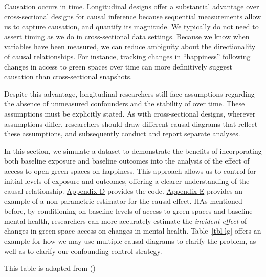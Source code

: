 \documentclass[
  singlecolumn]{article}
\begin{document}
Causation occurs in time. Longitudinal designs offer a substantial
advantage over cross-sectional designs for causal inference because
sequential measurements allow us to capture causation, and quantify its
magnitude. We typically do not need to assert timing as we do in
cross-sectional data settings. Because we know when variables have been
measured, we can reduce ambiguity about the directionality of causal
relationships. For instance, tracking changes in ``happiness'' following
changes in access to green spaces over time can more definitively
suggest causation than cross-sectional snapshots.

Despite this advantage, longitudinal researchers still face assumptions
regarding the absence of unmeasured confounders and the stability of
over time. These assumptions must be explicitly stated. As with
cross-sectional designs, wherever assumptions differ, researchers should
draw different causal diagrams that reflect these assumptions, and
subsequently conduct and report separate analyses.

In this section, we simulate a dataset to demonstrate the benefits of
incorporating both baseline exposure and baseline outcomes into the
analysis of the effect of access to open green spaces on happiness. This
approach allows us to control for initial levels of exposure and
outcomes, offering a clearer understanding of the causal relationship.
\hyperref[appendix-d-simulation-of-different-confounding-control-strategies]{Appendix
D} provides the code.
\hyperref[appendix-e-non-parametric-estimation-of-average-treatment-effects-using-causal-forests-appendix-causal-forests]{Appendix
E} provides an example of a non-parametric estimator for the causal
effect. HAs mentioned before, by conditioning on baseline levels of
access to green spaces and baseline mental health, researchers can more
accurately estimate the \emph{incident effect} of changes in green space
access on changes in mental health. Table~\ref{tbl-lg} offers an example
for how we may use multiple causal diagrams to clarify the problem, as
well as to clarify our confounding control strategy.

\begin{table}

\caption{\label{tbl-lg}This table is adapted from
()}

\centering{

\examplelongitudinal

}

\end{table}%
\end{document}
